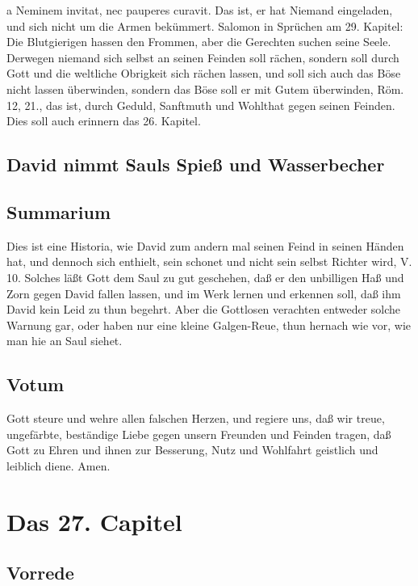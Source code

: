 a Neminem invitat, nec pauperes curavit. Das ist, er hat Niemand eingeladen, und sich nicht um die Armen bekümmert.
Salomon in Sprüchen am 29. Kapitel: Die Blutgierigen hassen den Frommen, aber die Gerechten suchen seine Seele. Derwegen niemand sich selbst an seinen Feinden soll rächen, sondern soll durch Gott und die weltliche Obrigkeit sich rächen lassen, und soll sich auch das Böse nicht lassen überwinden, sondern das Böse soll er mit Gutem überwinden, Röm. 12, 21., das ist, durch Geduld, Sanftmuth und Wohlthat gegen seinen Feinden. Dies soll auch erinnern das 26. Kapitel.

\section{David nimmt Sauls Spieß und Wasserbecher}

\section{Summarium}

Dies ist eine Historia, wie David zum andern mal seinen Feind in seinen Händen hat, und dennoch sich enthielt, sein schonet und nicht sein selbst Richter wird, V. 10. Solches läßt Gott dem Saul zu gut geschehen, daß er den unbilligen Haß und Zorn gegen David fallen lassen, und im Werk lernen und erkennen soll, daß ihm David kein Leid zu thun begehrt. Aber die Gottlosen verachten entweder solche Warnung gar, oder haben nur eine kleine Galgen-Reue, thun hernach wie vor, wie man hie an Saul siehet.

\section{Votum}

Gott steure und wehre allen falschen Herzen, und regiere uns, daß wir treue, ungefärbte, beständige Liebe gegen unsern Freunden und Feinden tragen, daß Gott zu Ehren und ihnen zur Besserung, Nutz und Wohlfahrt geistlich und leiblich diene. Amen.

\chapter{Das 27. Capitel}

\section{Vorrede}


